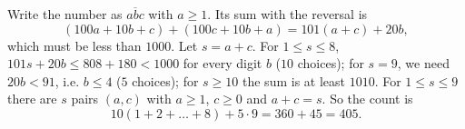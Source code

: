 Write the number as $\overline{abc}$ with $a\ge1$. Its sum with the reversal is
\[
(100a+10b+c)+(100c+10b+a)=101(a+c)+20b,
\]
which must be less than $1000$. Let $s=a+c$. For $1\le s\le8$, $101s+20b\le808+180<1000$ for every digit $b$ ($10$ choices); for $s=9$, we need $20b<91$, i.e. $b\le4$ ($5$ choices); for $s\ge10$ the sum is at least $1010$. For $1\le s\le9$ there are $s$ pairs $(a,c)$ with $a\ge1$, $c\ge0$ and $a+c=s$. So the count is
\[
10(1+2+\dots+8)+5\cdot9=360+45=\boxed{405}.
\]

